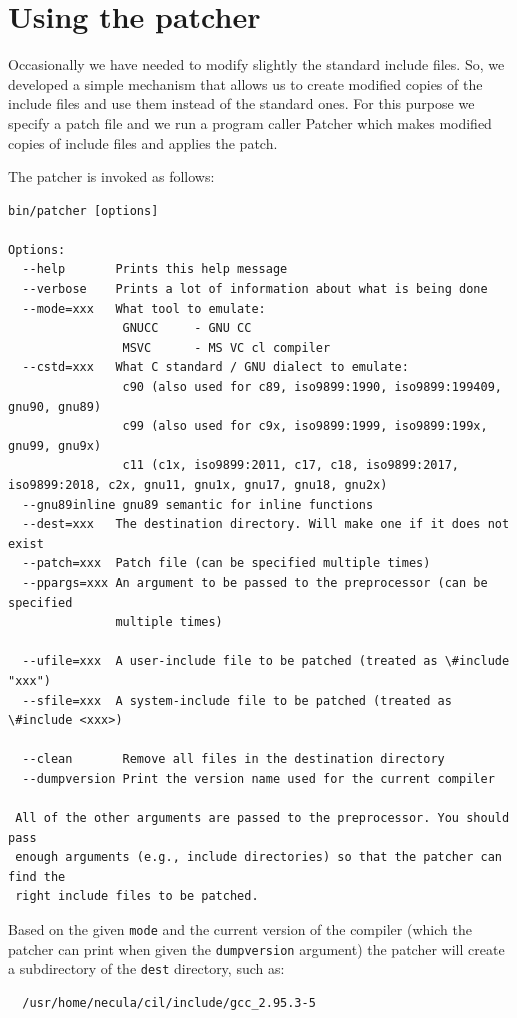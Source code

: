 \documentclass[letterpaper]{article}
\def\t#1{{\tt #1}}
\begin{document}
    \section{Using the patcher}\label{sec-patcher}

 Occasionally we have needed to modify slightly the standard include files.
So, we developed a simple mechanism that allows us to create modified copies
of the include files and use them instead of the standard ones. For this
purpose we specify a patch file and we run a program caller Patcher which
makes modified copies of include files and applies the patch.

 The patcher is invoked as follows:
\begin{verbatim}
bin/patcher [options]

Options:
  --help       Prints this help message
  --verbose    Prints a lot of information about what is being done
  --mode=xxx   What tool to emulate:
                GNUCC     - GNU CC
                MSVC      - MS VC cl compiler
  --cstd=xxx   What C standard / GNU dialect to emulate:
                c90 (also used for c89, iso9899:1990, iso9899:199409, gnu90, gnu89)
                c99 (also used for c9x, iso9899:1999, iso9899:199x, gnu99, gnu9x)
                c11 (c1x, iso9899:2011, c17, c18, iso9899:2017, iso9899:2018, c2x, gnu11, gnu1x, gnu17, gnu18, gnu2x)
  --gnu89inline gnu89 semantic for inline functions
  --dest=xxx   The destination directory. Will make one if it does not exist
  --patch=xxx  Patch file (can be specified multiple times)
  --ppargs=xxx An argument to be passed to the preprocessor (can be specified
               multiple times)

  --ufile=xxx  A user-include file to be patched (treated as \#include "xxx")
  --sfile=xxx  A system-include file to be patched (treated as \#include <xxx>)

  --clean       Remove all files in the destination directory
  --dumpversion Print the version name used for the current compiler

 All of the other arguments are passed to the preprocessor. You should pass
 enough arguments (e.g., include directories) so that the patcher can find the
 right include files to be patched.
\end{verbatim}

 Based on the given \t{mode} and the current version of the compiler (which
the patcher can print when given the \t{dumpversion} argument) the patcher
will create a subdirectory of the \t{dest} directory, such as:
\begin{verbatim}
  /usr/home/necula/cil/include/gcc_2.95.3-5
\end{verbatim}
\end{document}

